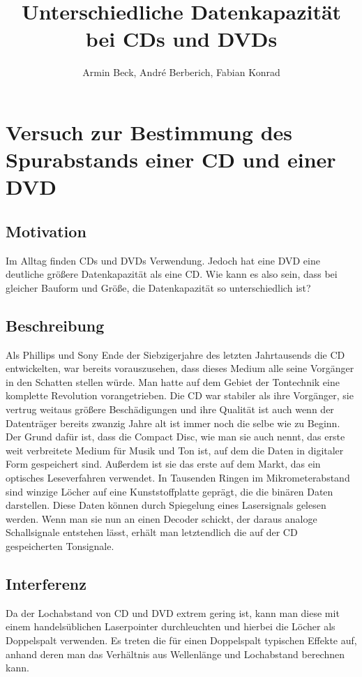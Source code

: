 \documentclass{scrreprt}
\author{Armin Beck, André Berberich, Fabian Konrad}
\title{Unterschiedliche Datenkapazität bei CDs und DVDs}
\begin{document}
\maketitle
\newpage

\chapter{Versuch zur Bestimmung des Spurabstands einer CD und einer DVD}

\section{Motivation}
Im Alltag finden CDs und DVDs Verwendung. Jedoch hat eine DVD eine deutliche größere Datenkapazität als eine CD. Wie kann es also sein, dass bei gleicher Bauform und Größe, die Datenkapazität so unterschiedlich ist?

\section{Beschreibung}
Als Phillips und Sony Ende der Siebzigerjahre des letzten Jahrtausends die CD entwickelten, war bereits vorauszusehen, dass dieses Medium alle seine Vorgänger in den Schatten stellen würde. Man hatte auf dem Gebiet der Tontechnik eine komplette Revolution vorangetrieben. Die CD war stabiler als ihre Vorgänger, sie vertrug weitaus größere Beschädigungen und ihre Qualität ist auch wenn der Datenträger bereits zwanzig Jahre alt ist immer noch die selbe wie zu Beginn. Der Grund dafür ist, dass die Compact Disc, wie man sie auch nennt, das erste weit verbreitete Medium für Musik und Ton ist, auf dem die Daten in digitaler Form gespeichert sind. Außerdem ist sie das erste auf dem Markt, das ein optisches Leseverfahren verwendet. In Tausenden Ringen im Mikrometerabstand sind winzige Löcher auf eine Kunststoffplatte geprägt, die die binären Daten darstellen. Diese Daten können durch Spiegelung eines Lasersignals gelesen werden. Wenn man sie nun an einen Decoder schickt, der daraus analoge Schallsignale entstehen lässt, erhält man letztendlich die auf der CD gespeicherten Tonsignale. 


\section{Interferenz}


 Da der Lochabstand von CD und DVD extrem gering ist, kann man diese mit einem handelsüblichen Laserpointer durchleuchten und hierbei die Löcher als Doppelspalt verwenden. Es treten die für einen Doppelspalt typischen Effekte auf, anhand deren man das Verhältnis aus Wellenlänge und Lochabstand berechnen kann.
\end{document}
